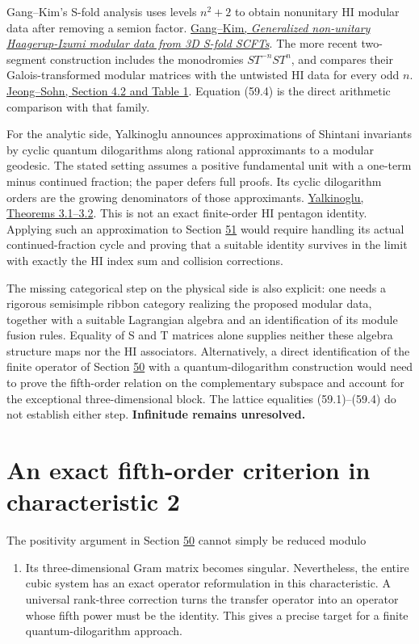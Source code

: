 \documentclass[11pt,reqno]{amsart}
\theoremstyle{plain}
\begin{document}
Gang--Kim's S-fold analysis uses levels \(n^2+2\) to obtain
nonunitary HI modular data after removing a semion factor.
\href{https://arxiv.org/abs/2211.13561}{Gang--Kim, \emph{Generalized non-unitary Haagerup-Izumi modular data from
3D S-fold SCFTs}}.
The more recent two-segment construction includes the monodromies
\(ST^{-n}ST^n\), and compares their Galois-transformed modular
matrices with the untwisted HI data for every odd \(n\).
\href{https://arxiv.org/html/2608.11946v1\#S4.SS2}{Jeong--Sohn, Section 4.2 and Table 1}.
Equation (59.4) is the direct arithmetic comparison with that family.

For the analytic side, Yalkinoglu announces approximations of
Shintani invariants by cyclic quantum dilogarithms along rational
approximants to a modular geodesic. The stated setting assumes a
positive fundamental unit with a one-term minus continued fraction;
the paper defers full proofs. Its cyclic dilogarithm orders are the
growing denominators of those approximants.
\href{https://arxiv.org/pdf/2508.18320}{Yalkinoglu, Theorems 3.1--3.2}.
This is not an exact finite-order HI pentagon identity. Applying such
an approximation to Section \hyperref[sec:51]{51} would require handling its actual
continued-fraction cycle and proving that a suitable identity survives
in the limit with exactly the HI index sum and collision corrections.

The missing categorical step on the physical side is also explicit:
one needs a rigorous semisimple ribbon category realizing the proposed
modular data, together with a suitable Lagrangian algebra and an
identification of its module fusion rules. Equality of S and T
matrices alone supplies neither these algebra structure maps nor the
HI associators. Alternatively, a direct identification of the
finite operator of Section \hyperref[sec:50]{50} with a quantum-dilogarithm construction
would need to prove the fifth-order relation on the complementary
subspace and account for the exceptional three-dimensional block. The lattice equalities (59.1)--(59.4) do not
establish either step. \textbf{Infinitude remains unresolved.}

\section{An exact fifth-order criterion in characteristic 2}\label{sec:60}

The positivity argument in Section \hyperref[sec:50]{50} cannot simply be reduced modulo
\begin{enumerate}
\item Its three-dimensional Gram matrix becomes singular. Nevertheless,
the entire cubic system has an exact operator reformulation in this
characteristic. A universal rank-three correction turns the transfer
operator into an operator whose fifth power must be the identity.
This gives a precise target for a finite quantum-dilogarithm approach.
\end{enumerate}
\end{document}
